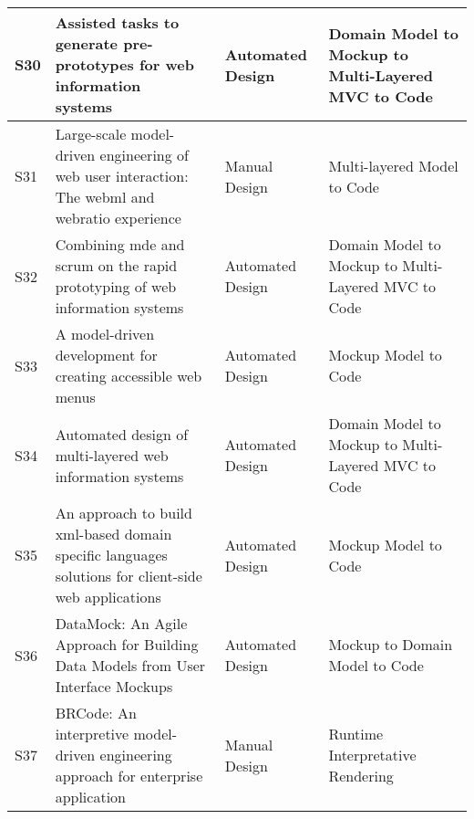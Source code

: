 \begin{table*}[ht!]
\begin{tabular}{ | p{0.3cm} | p{9.5cm} | p{2.2cm} |  p{4.2cm} |}
S30 &  Assisted tasks to generate pre-prototypes for web information systems~\cite{Basso14ICEISb} & Automated Design & Domain Model to Mockup to Multi-Layered MVC to Code \\ \hline

S31 &  Large-scale model-driven engineering of web user interaction: The webml and webratio experience~\cite{Brambilla14} & Manual Design  & Multi-layered Model to Code \\ \hline

S32 &  Combining mde and scrum on the rapid prototyping of web information systems~\cite{Basso15IJWET} & Automated Design  & Domain Model to Mockup to Multi-Layered MVC to Code  \\ \hline

S33 &  A model-driven development for creating accessible web menus~\cite{antonelli2015model} & Automated Design & Mockup Model to Code \\ \hline

S34 &  Automated design of multi-layered web information systems~\cite{Basso16JSS} & Automated Design  & Domain Model to Mockup to Multi-Layered MVC to Code  \\ \hline

S35 &  An approach to build xml-based domain specific languages solutions for client-side web applications~\cite{chavarriaga2017approach} & Automated Design  & Mockup Model to Code \\ \hline


S36 &  DataMock: An Agile Approach for Building Data Models from User Interface Mockups~\cite{Rivero2017} & Automated Design & Mockup to Domain Model to Code\\ \hline

S37 &  BRCode: An interpretive model-driven engineering approach for enterprise application~\cite{OLIVEIRA201886} & Manual Design & Runtime Interpretative Rendering\\ \hline

\end{tabular}

\label{table:npapers} 
\end{table*}

